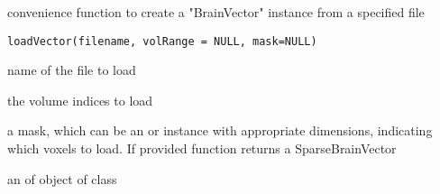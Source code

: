 \begin{Description}\relax
convenience function to create a "BrainVector" instance from a
specified file
\end{Description}
\begin{Usage}
\begin{verbatim}
loadVector(filename, volRange = NULL, mask=NULL)
\end{verbatim}
\end{Usage}
\begin{Arguments}
\begin{ldescription}
\item[\code{filename}] name of the file to load 
\item[\code{volRange}] the volume indices to load 
\item[\code{mask}] a mask, which can be an  or  instance with appropriate dimensions, indicating which voxels to load. If provided function returns a SparseBrainVector 
\end{ldescription}
\end{Arguments}
\begin{Value}
an of object of class 
\end{Value}

